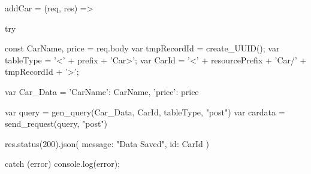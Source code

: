 addCar = (req, res) => {
    try {
        const { CarName, price } = req.body
        var tmpRecordId = create_UUID();
        var tableType = '<' + prefix + 'Car>';
        var CarId = '<' + resourcePrefix + 'Car/' + tmpRecordId + '>';

        var Car_Data = {
            'CarName': CarName,
            'price': price
        }

        var query = gen_query(Car_Data, CarId, tableType, "post")
        var cardata = send_request(query, "post")

        res.status(200).json({ message: "Data Saved", id: CarId })
    } catch (error) {
        console.log(error);
    }
}